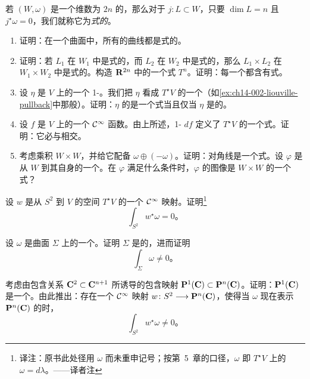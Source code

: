 \begin{exercise}[\trLagrange{}\trSubmanifold]\label{ex:ch14-003-lagrangian-submanifolds}
若 $(W,\omega)$ 是一个维数为 $2n$ 的\trSymplectic\trManifold，那么对于\trSubmanifold{} $j\colon L\subset W$，只要 $\dim L=n$ 且 $j^\star\omega=0$，我们就称它为\emph{\trLagrange{}式的}。

\begin{enumerate}[label=(\arabic*)]
\item 证明：在一个\trSymplectic{}曲面中，所有的曲线都是\trLagrange{}式的。
\item 证明：若 $L_1$ 在 $W_1$ 中是\trLagrange{}式的，而 $L_2$ 在 $W_2$ 中是\trLagrange{}式的，那么 $L_1\times L_2$ 在 $W_1\times W_2$ 中是\trLagrange{}式的。构造 $\mathbf{R}^{2n}$ 中的一个\trLagrange{}式\trTorus{} $T^n$。证明：每一个\trSymplectic\trManifold{}都含有\trLagrange{}式\trTorus。
\item 设 $\eta$ 是\trManifold{} $V$ 上的一个 1-\trForm。我们把 $\eta$ 看成 $T^\star V$ 的一个\trSection（如\cref{ex:ch14-002-liouville-pullback}中那般）。证明：$\eta$ 的\trImage{}是一个\trLagrange{}式\trSubmanifold{}当且仅当\trForm{} $\eta$ 是\trClosed{}的。
\item 设 $f$ 是\trCompact{}\trManifold{} $V$ 上的一个 $\mathcal{C}^\infty$ 函数。由上所述，1-\trForm{} $df$ 定义了 $T^\star V$ 的一个\trLagrange{}式\trSubmanifold。证明：它必与\trZeroSection{}相交。
\item 考虑乘积\trManifold{} $W\times W$，并给它配备\trSymplecticForm{} $\omega\oplus(-\omega)$。证明：对角线是一个\trLagrange{}式\trSubmanifold。设 $\varphi$ 是从 $W$ 到其自身的一个\trDiffeomorphism。在 $\varphi$ 满足什么条件时，$\varphi$ 的图像是 $W\times W$ 的一个\trLagrange{}式\trSubmanifold？
\end{enumerate}
\end{exercise}

\begin{exercise}\label{ex:ch14-004-cotangent-integral}
设 $w$ 是从\trSphere{} $S^2$ 到\trManifold{} $V$ 的\trCotangent{}空间 $T^\star V$ 的一个 $\mathcal{C}^\infty$ 映射。证明\footnote{译注：原书此处径用 $\omega$ 而未重申记号；按第~5~章的口径，$\omega$ 即 $T^\star V$ 上的\trCanonical{}\trSymplecticForm{} $\omega=d\lambda$。——译者注}
\[
\int_{S^2}w^\star\omega=0\text{。}
\]
\end{exercise}

\begin{exercise}\label{ex:ch14-005-symplectic-surface}
设 $\omega$ 是\trCompact{}曲面 $\Sigma$ 上的一个\trSymplecticForm。证明 $\Sigma$ 是\trOrientation{}的，进而证明
\[
\int_{\Sigma}\omega\neq 0\text{。}
\]

考虑由包含关系 $\mathbf{C}^2\subset\mathbf{C}^{n+1}$ 所诱导的包含映射 $\mathbf{P}^1(\mathbf{C})\subset\mathbf{P}^n(\mathbf{C})$。证明：$\mathbf{P}^1(\mathbf{C})$ 是一个\trSymplectic\trSubmanifold。由此推出：存在一个 $\mathcal{C}^\infty$ 映射 $w\colon S^2\longrightarrow\mathbf{P}^n(\mathbf{C})$，使得当 $\omega$ 现在表示 $\mathbf{P}^n(\mathbf{C})$ 的\trSymplecticForm{}时，
\[
\int_{S^2}w^\star\omega\neq 0\text{。}
\]
\end{exercise}

